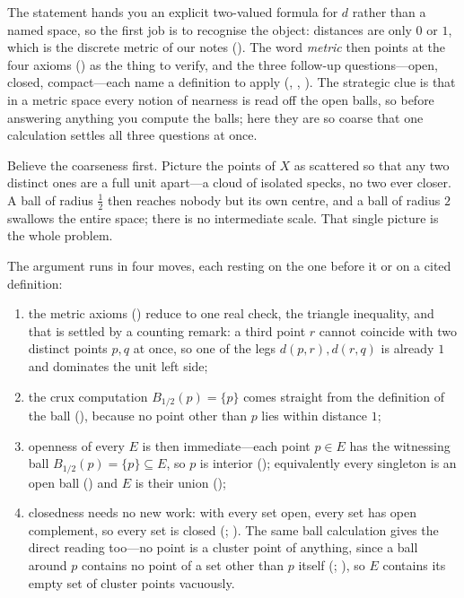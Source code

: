 \documentclass[main.tex]{subfiles}
\begin{document}
\begin{Reflection}
The statement hands you an explicit two-valued formula for $d$ rather than a named space, so the first
job is to recognise the object: distances are only $0$ or $1$, which is the discrete metric of our notes
(). The word \emph{metric} then points at the four axioms () as the thing to
verify, and the three follow-up questions---open, closed, compact---each name a definition to apply
(, , ). The strategic clue is that in a metric space every
notion of nearness is read off the open balls, so before answering anything you compute the balls; here
they are so coarse that one calculation settles all three questions at once.

Believe the coarseness first. Picture the points of $X$ as scattered so that any two distinct ones are a
full unit apart---a cloud of isolated specks, no two ever closer. A ball of radius $\tfrac12$ then
reaches nobody but its own centre, and a ball of radius $2$ swallows the entire space; there is no
intermediate scale. That single picture is the whole problem.

The argument runs in four moves, each resting on the one before it or on a cited definition:
\begin{enumerate}[leftmargin=1.7em,itemsep=3pt,topsep=2pt,label=\textnormal{(\arabic*)}]
  \item the metric axioms () reduce to one real check, the triangle inequality, and that
        is settled by a counting remark: a third point $r$ cannot coincide with two distinct points
        $p,q$ at once, so one of the legs $d(p,r),d(r,q)$ is already $1$ and dominates the unit left
        side;
  \item the crux computation $B_{1/2}(p)=\{p\}$ comes straight from the definition of the ball
        (), because no point other than $p$ lies within distance $1$;
  \item openness of every $E$ is then immediate---each point $p\in E$ has the witnessing ball
        $B_{1/2}(p)=\{p\}\subseteq E$, so $p$ is interior (); equivalently every singleton
        is an open ball () and $E$ is their union
        ();
  \item closedness needs no new work: with every set open, every set has open complement, so every set
        is closed (; ). The same
        ball calculation gives the direct reading too---no point is a cluster point of anything, since a
        ball around $p$ contains no point of a set other than $p$ itself (;
        ), so $E$ contains its
        empty set of cluster points vacuously.
\end{enumerate}


\end{Reflection}
\end{document}

